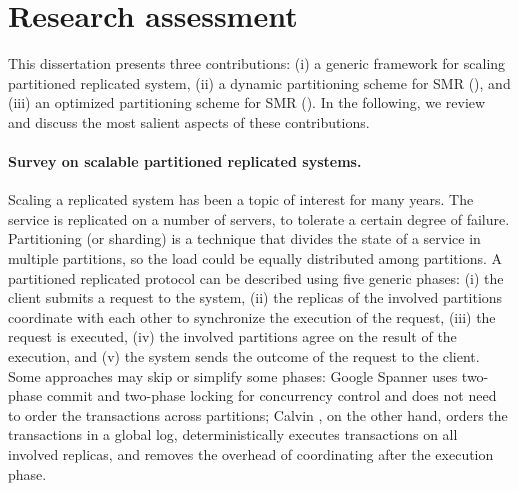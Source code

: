 \section{Research assessment}

This dissertation presents three contributions: (i) a generic framework for
scaling partitioned replicated system, (ii) a dynamic partitioning scheme for SMR
(\dssmr), and (iii) an optimized partitioning scheme for SMR (\dynastar). In the following,
we review and discuss the most salient aspects of these contributions.

\paragraph{Survey on scalable partitioned replicated systems.}
Scaling a replicated system has been a topic of interest for many years. The
service is replicated on a number of servers, to tolerate a certain degree of
failure. Partitioning (or sharding) is a technique that divides the state of a
service in multiple partitions, so the load could be  equally distributed among
partitions. A partitioned replicated protocol can be described using five
generic phases: (i) the client submits a request to the system, (ii) the replicas
of the involved partitions coordinate with each other to synchronize the execution
of the request, (iii) the request is executed, (iv) the involved partitions
agree on the result of the execution, and (v) the system sends the outcome of the
request to the client. Some approaches may skip or simplify some phases: Google
Spanner \cite{corbett2013spanner} uses two-phase commit and two-phase locking
for concurrency control and does not need to order the transactions across
partitions; Calvin \cite{calvin}, on the other hand, orders the transactions in
a global log, deterministically executes transactions on all involved replicas,
and removes the overhead of coordinating after the execution phase.

